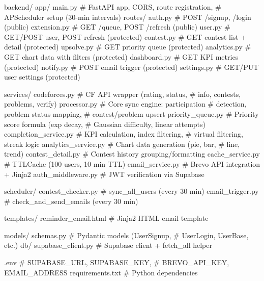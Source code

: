 \documentclass[11pt, a4paper]{article}
\begin{document}
\begin{codebox}
backend/
  app/
    main.py                            # FastAPI app, CORS, route registration,
                                       # APScheduler setup (30-min intervals)
    routes/
      auth.py                          # POST /signup, /login (public)
      extension.py                     # GET /queue, POST /refresh (public)
      user.py                          # GET/POST user, POST refresh (protected)
      contest.py                       # GET contest list + detail (protected)
      upsolve.py                       # GET priority queue (protected)
      analytics.py                     # GET chart data with filters (protected)
      dashboard.py                     # GET KPI metrics (protected)
      notify.py                        # POST email trigger (protected)
      settings.py                      # GET/PUT user settings (protected)

    services/
      codeforces.py                    # CF API wrapper (rating, status,
                                       # info, contests, problems, verify)
      processor.py                     # Core sync engine: participation
                                       # detection, problem status mapping,
                                       # contest/problem upsert
      priority_queue.py                # Priority score formula (exp decay,
                                       # Gaussian difficulty, linear attempts)
      completion_service.py            # KPI calculation, index filtering,
                                       # virtual filtering, streak logic
      analytics_service.py             # Chart data generation (pie, bar,
                                       # line, trend)
      contest_detail.py                # Contest history grouping/formatting
      cache_service.py                 # TTLCache (100 users, 10 min TTL)
      email_service.py                 # Brevo API integration + Jinja2
      auth_middleware.py               # JWT verification via Supabase

    scheduler/
      contest_checker.py               # sync_all_users (every 30 min)
      email_trigger.py                 # check_and_send_emails (every 30 min)

    templates/
      reminder_email.html              # Jinja2 HTML email template

    models/
      schemas.py                       # Pydantic models (UserSignup,
                                       # UserLogin, UserBase, etc.)
    db/
      supabase_client.py               # Supabase client + fetch_all helper

  .env                                 # SUPABASE_URL, SUPABASE_KEY,
                                       # BREVO_API_KEY, EMAIL_ADDRESS
  requirements.txt                     # Python dependencies
\end{codebox}
\end{document}
